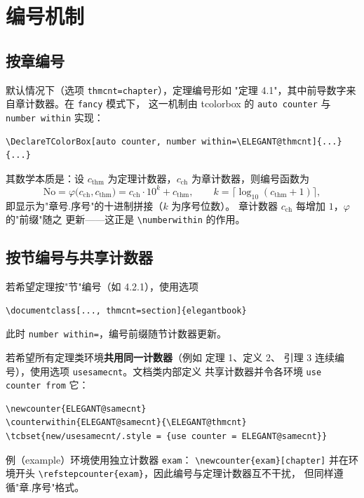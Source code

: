 \section{编号机制}

\subsection{按章编号}

默认情况下（选项 \texttt{thmcnt=chapter}），定理编号形如
"定理 4.1"，其中前导数字来自章计数器。在 \texttt{fancy} 模式下，
这一机制由 tcolorbox 的 \texttt{auto counter} 与
\texttt{number within} 实现：

\begin{lstlisting}
\DeclareTColorBox[auto counter, number within=\ELEGANT@thmcnt]{...}{...}
\end{lstlisting}

其数学本质是：设 $c_{\mathrm{thm}}$ 为定理计数器，$c_{\mathrm{ch}}$
为章计数器，则编号函数为
\begin{equation}
  \mathrm{No} = \varphi\bigl(c_{\mathrm{ch}}, c_{\mathrm{thm}}\bigr)
  = c_{\mathrm{ch}} \cdot 10^{k} + c_{\mathrm{thm}},
  \qquad k = \lceil \log_{10}(c_{\mathrm{thm}}+1)\rceil,
  \label{eq:numbering}
\end{equation}
即显示为"章号.序号"的十进制拼接（$k$ 为序号位数）。
章计数器 $c_{\mathrm{ch}}$ 每增加 $1$，$\varphi$ 的"前缀"随之
更新——这正是 \verb|\numberwithin| 的作用。

\subsection{按节编号与共享计数器}

若希望定理按"节"编号（如 4.2.1），使用选项
\begin{lstlisting}
\documentclass[..., thmcnt=section]{elegantbook}
\end{lstlisting}
此时 \texttt{number within=\thesection}，编号前缀随节计数器更新。

若希望所有定理类环境\textbf{共用同一计数器}（例如 定理 1、定义 2、
引理 3 连续编号），使用选项 \texttt{usesamecnt}。文档类内部定义
共享计数器并令各环境 \texttt{use counter from} 它：
\begin{lstlisting}
\newcounter{ELEGANT@samecnt}
\counterwithin{ELEGANT@samecnt}{\ELEGANT@thmcnt}
\tcbset{new/usesamecnt/.style = {use counter = ELEGANT@samecnt}}
\end{lstlisting}

\begin{remark}
例（example）环境使用独立计数器 \texttt{exam}：
\verb|\newcounter{exam}[chapter]| 并在环境开头
\verb|\refstepcounter{exam}|，因此编号与定理计数器互不干扰，
但同样遵循"章.序号"格式。
\end{remark}

